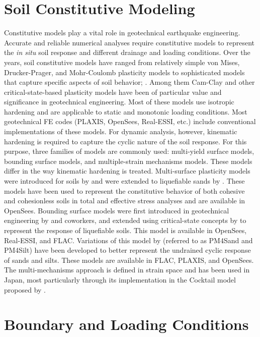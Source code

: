 \section{Soil Constitutive Modeling}
\label{sec:resp_geotech_4}

Constitutive models play a vital role in geotechnical earthquake engineering. Accurate and reliable numerical analyses require constitutive models to represent the \textit{in situ} soil response and different drainage and loading conditions. Over the years, soil constitutive models  have ranged from relatively simple von Mises, Drucker-Prager, and Mohr-Coulomb plasticity models to sophisticated models that capture specific aspects of soil behavior; \cite[see][]{Borja2013}. Among them Cam-Clay and other critical-state-based plasticity models have been of particular value and significance in geotechnical engineering. Most of these models use isotropic hardening and are applicable to static and monotonic loading conditions. Most geotechnical FE codes (PLAXIS, OpenSees, Real-ESSI, etc.) include conventional implementations of these models. For dynamic analysis, however, kinematic hardening is required to capture the cyclic nature of the soil response. For this purpose, three families of models are commonly used: multi-yield surface models, bounding surface models, and multiple-strain mechanisms models. These models differ in the way kinematic hardening is treated. Multi-surface plasticity models were introduced for soils by \citet{Prevost77, Prevost85a} and were extended to liquefiable sands by \citet{Elgamal03}. These models have been used to represent the constitutive behavior of both cohesive and cohesionless soils in total and effective stress analyses and are available in OpenSees. Bounding surface models were first introduced in geotechnical engineering by \citet{Dafalias86} and coworkers, and extended using critical-state concepts by \citet{Dafalias04} to represent the response of liquefiable soils. This model is available in OpenSees, Real-ESSI, and FLAC. Variations of this model by \citet{boulanger2017pm4sand, boulanger2018pm4silt} (referred to as PM4Sand and PM4Silt) have been developed to better represent the undrained cyclic response of sands and silts. These models are available in FLAC, PLAXIS, and OpenSees. The multi-mechanisms approach is defined in strain space and has been used in Japan, most particularly through its implementation in the Cocktail model proposed by \citet{iai2011dilatancy, iai2013finite}.

\section{Boundary and Loading Conditions}
\label{sec:resp_geotech_5}

